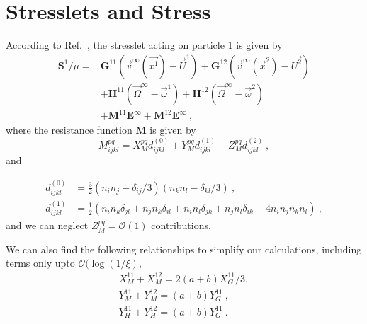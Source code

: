 \documentclass[reprint, amsmath,amssymb,aps,pre,onecolumn,notitlepage%
]{revtex4-1}
\begin{document}
\section{Stresslets and Stress}
According to Ref.~\cite{KK1991}, the stresslet acting on particle 1 is given by
\begin{equation}
	\begin{split}
		\bm{S}^1/\mu=& \bm{G}^{11}(\vec{v}^\infty(\vec{x^1})-\vec{U}^1)+\bm{G}^{12}(\vec{v}^\infty(\vec{x}^2)-\vec{U^2})\\
		&+ \bm{H}^{11}(\vec{\Omega}^\infty-\vec{\omega}^1)+\bm{H}^{12}(\vec{\Omega}^\infty-\vec{\omega}^2)\\
		&+ \bm{M}^{11}\bm{E}^\infty + \bm{M}^{12}\bm{E}^\infty \ ,
	\end{split}
	\label{eq:stresslet1}
\end{equation}
where the resistance function $\bm{M}$ is given by 
\begin{equation}
		M^{pq}_{ijkl}=X_M^{pq}d^{(0)}_{ijkl}+Y_M^{pq}d^{(1)}_{ijkl} +Z_M^{pq}d^{(2)}_{ijkl} \ ,
\end{equation}
and 

\begin{equation}
	\begin{split}
		d^{(0)}_{ijkl}&=\frac{3}{2}(n_in_j-\delta_{ij}/3)(n_kn_l-\delta_{kl}/3)\ ,\\
		d^{(1)}_{ijkl}&=\frac{1}{2}(n_in_k\delta_{jl}+n_jn_k\delta_{il}+n_in_l\delta_{jk}+n_jn_l\delta_{ik}-4 n_i n_j n_k n_l)\ ,
	\end{split}
\end{equation}
and we can neglect $Z_M^{pq}=\mathcal{O}(1)$ contributions.

We can also find the following relationships to simplify our calculations, including terms only upto $\mathcal{O}(\log{(1/\xi)}$,
\begin{equation}
	\begin{split}
		X_M^{11}+X_M^{12}=2(a+b)X_G^{11}/3,\\
		Y_M^{11}+Y_M^{12}=(a+b)Y_G^{11}\ , \\
		Y_H^{11}+Y_H^{12}=(a+b)Y_G^{11}\ . 
	\end{split}
\end{equation}
\end{document}
